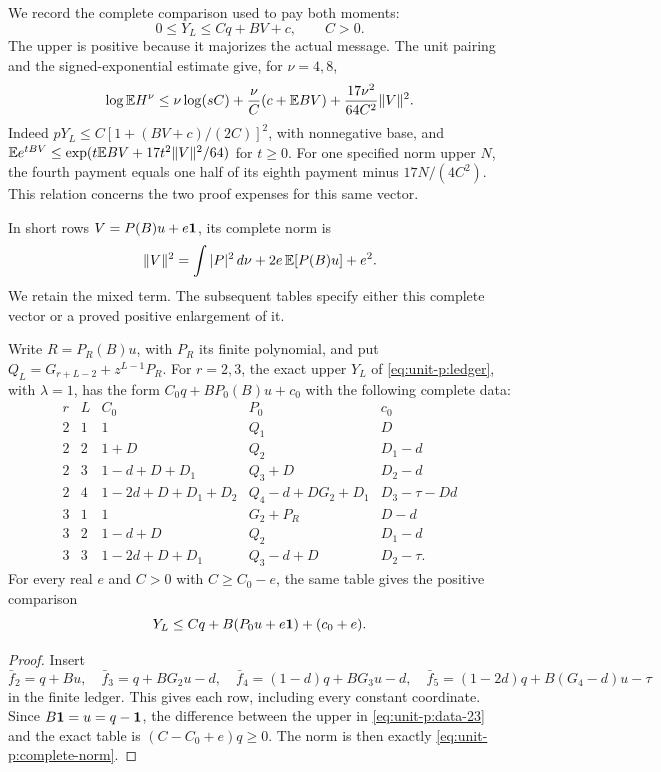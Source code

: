 We record the complete comparison used to pay both moments:
\begin{equation}\label{eq:unit-p:comparison}
 0\le Y_L\le Cq+BV+c,\qquad C>0.
\end{equation}
The upper is positive because it majorizes the actual message.
The unit pairing and the signed-exponential estimate give, for
\(\nu=4,8\),
\begin{equation}\label{eq:unit-p:joint-payment}
 \log\mathbb E H^\nu
 \le \nu\log(sC)+\frac{\nu}{C}(c+\mathbb E BV)
                   +\frac{17\nu^2}{64C^2}\|V\|^2.
\end{equation}
Indeed \(pY_L\le C[1+(BV+c)/(2C)]^2\), with nonnegative base,
and \(\mathbb E e^{tBV}\le
\exp(t\mathbb E BV+17t^2\|V\|^2/64)\) for \(t\ge0\).
For one specified norm upper \(N\), the fourth payment equals
one half of its eighth payment minus \(17N/(4C^2)\).
This relation concerns the two proof expenses for this same vector.

In short rows \(V=P(B)u+e\mathbf1\), its complete norm is
\begin{equation}\label{eq:unit-p:complete-norm}
 \|V\|^2=\int|P|^2\,d\nu+
                2e\,\mathbb E[P(B)u]+e^2.
\end{equation}
We retain the mixed term. The subsequent tables specify either this
complete vector or a proved positive enlargement of it.

\begin{lemma}\label{lem:unit-p:short-ledger}
Write \(R=P_R(B)u\), with \(P_R\) its finite polynomial, and put
\(Q_L=G_{r+L-2}+z^{L-1}P_R\).
For \(r=2,3\), the exact upper \(Y_L\) of
\eqref{eq:unit-p:ledger}, with \(\lambda=1\), has the form
\(C_0q+BP_0(B)u+c_0\) with the following complete data:
\begin{equation}\label{eq:unit-p:short-ledger}
\begin{array}{cc|c|c|c}
 r&L&C_0&P_0&c_0\\\hline
 2&1&1&Q_1&D\\
 2&2&1+D&Q_2&D_1-d\\
 2&3&1-d+D+D_1&Q_3+D&D_2-d\\
 2&4&1-2d+D+D_1+D_2&
                   Q_4-d+DG_2+D_1&D_3-\tau-Dd\\
 3&1&1&G_2+P_R&D-d\\
 3&2&1-d+D&Q_2&D_1-d\\
 3&3&1-2d+D+D_1&Q_3-d+D&D_2-\tau .
\end{array}
\end{equation}
For every real \(e\) and \(C>0\) with \(C\ge C_0-e\), the same
table gives the positive comparison
\begin{equation}\label{eq:unit-p:data-23}
Y_L\le Cq+B(P_0u+e\mathbf1)+(c_0+e).
\end{equation}
\end{lemma}
\begin{proof}
Insert
\[
 \bar f_2=q+Bu,\quad \bar f_3=q+BG_2u-d,\quad
 \bar f_4=(1-d)q+BG_3u-d,\quad
 \bar f_5=(1-2d)q+B(G_4-d)u-\tau
\]
in the finite ledger. This gives each row, including every
constant coordinate. Since \(B\mathbf1=u=q-\mathbf1\), the difference
between the upper in \eqref{eq:unit-p:data-23} and the exact table is
\((C-C_0+e)q\ge0\).
The norm is then exactly \eqref{eq:unit-p:complete-norm}.
\end{proof}

